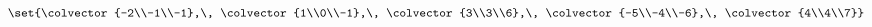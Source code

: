 $\set{%
\colvector{-2\\-1\\-1},\,
\colvector{1\\0\\-1},\,
\colvector{3\\3\\6},\,
\colvector{-5\\-4\\-6},\,
\colvector{4\\4\\7}%
}$
